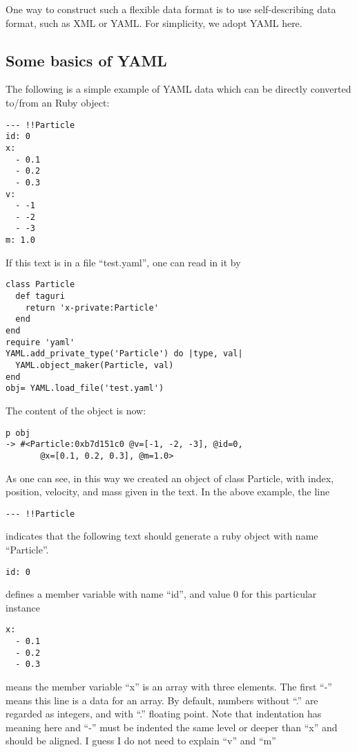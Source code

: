 \documentclass[12pt]{article}
\begin{document}
One way to construct such a flexible data format is to use
self-describing data format, such as XML or YAML. For simplicity,
we adopt YAML here.

\subsection{Some basics of YAML}

The following is a simple example of YAML data which can be directly
converted to/from an Ruby object:

\begin{verbatim}
--- !!Particle
id: 0
x:
  - 0.1
  - 0.2
  - 0.3
v:
  - -1
  - -2
  - -3
m: 1.0
\end{verbatim}

If this text is in a file ``test.yaml'', one can read in it by

\begin{verbatim}
class Particle
  def taguri
    return 'x-private:Particle'
  end
end
require 'yaml'
YAML.add_private_type('Particle') do |type, val|
  YAML.object_maker(Particle, val)
end
obj= YAML.load_file('test.yaml')
\end{verbatim}

The content of the object is now:
\begin{verbatim}
p obj
-> #<Particle:0xb7d151c0 @v=[-1, -2, -3], @id=0,
       @x=[0.1, 0.2, 0.3], @m=1.0>
\end{verbatim}

As one can see, in this way we created an object of class Particle,
with index, position, velocity, and mass given in the text. In the
above example, the line

\begin{verbatim}
--- !!Particle
\end{verbatim}
indicates that the following text should generate a ruby object with
name ``Particle''.

\begin{verbatim}
id: 0
\end{verbatim}
defines a member variable with name ``id'', and value 0 for this
particular instance
\begin{verbatim}
x:
  - 0.1
  - 0.2
  - 0.3
\end{verbatim}
means the member variable ``x'' is an array with three elements. The
first ``-'' means this line is a data for an array.
By default, numbers without ``.'' are regarded as integers, and with
``.'' floating point. Note that indentation has meaning here and ``-''
must be indented the same level or deeper than ``x'' and should be aligned.
I guess I do not need to explain ``v'' and ``m''
\end{document}
